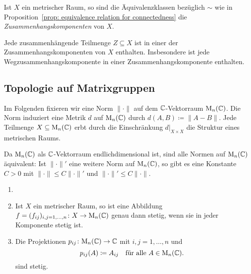 \begin{definition}
  Ist $X$ ein metrischer Raum, so sind die Äquivalenzklassen bezüglich $\sim$ wie in Proposition~\ref{prop: equivalence relation for connectedness} die \emph{Zusammenhangskomponenten} von $X$.
\end{definition}


\begin{remark}
  Jede zusammenhängende Teilmenge $Z \subseteq X$ ist in einer der Zusammenhangskomponenten von $X$ enthalten.
  Insbesondere ist jede Wegzusammenhangskomponente in einer Zusammenhangskomponente enthalten.
\end{remark}










\subsection{Topologie auf Matrixgruppen}


Im Folgenden fixieren wir eine Norm $\|\cdot\|$ auf dem $\mathbb{C}$-Vektorraum $\mathrm{M}_n(\mathbb{C})$.
Die Norm induziert eine Metrik $d$ auf $\mathrm{M}_n(\mathbb{C})$ durch $d(A,B) \coloneqq \|A-B\|$.
Jede Teilmenge $X \subseteq \mathrm{M}_n(\mathbb{C})$ erbt durch die Einschränkung $d|_{X \times X}$ die Struktur eines metrischen Raums.


\begin{remark}
  Da $\mathrm{M}_n(\mathbb{C})$ als $\mathbb{C}$-Vektorraum endlichdimensional ist, sind alle Normen auf $\mathrm{M}_n(\mathbb{C})$ äquivalent:
  Ist $\|\cdot\|'$ eine weitere Norm auf $\mathrm{M}_n(\mathbb{C})$, so gibt es eine Konstante $C > 0$ mit $\|\cdot\| \leq C \|\cdot\|'$ und $\|\cdot\|' \leq C \|\cdot\|$.
\end{remark}


\begin{lemma}
  \begin{enumerate}[leftmargin=*, label=\roman*)]
    \item
      
    \item
      Ist $X$ ein metrischer Raum, so ist eine Abbildung $f = (f_{ij})_{i,j = 1, \dotsc, n} \colon X \to \mathrm{M}_n(\mathbb{C})$ genau dann stetig, wenn sie in jeder Komponente stetig ist.
    \item
      Die Projektionen $p_{ij} \colon \mathrm{M}_n(\mathbb{C}) \to \mathbb{C}$ mit $i,j = 1, \dotsc, n$ und
      \[
        p_{ij}(A) \coloneqq A_{ij}
        \quad
        \text{für alle $A \in \mathrm{M}_n(\mathbb{C})$}.
      \]
      sind stetig.
 \end{enumerate}
\end{lemma}



























